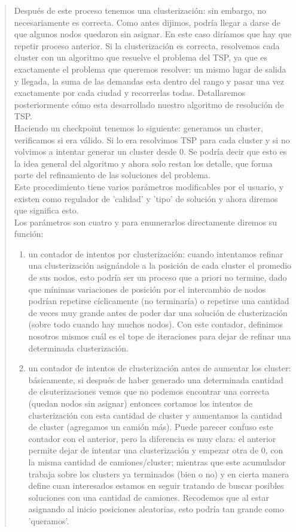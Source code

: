 \documentclass[11pt,a4paper]{article}
\begin{document}
\begin{verse}
Después de este proceso tenemos una clusterización: sin embargo, no necesariamente es correcta. Como antes dijimos, podría llegar a darse de que algunos nodos quedaron sin asignar. En este caso diríamos que hay que repetir proceso anterior. Si la clusterización es correcta, resolvemos cada cluster con un algoritmo que resuelve el problema del TSP, ya que es exactamente el problema que queremos resolver: un mismo lugar de salida y llegada, la suma de las demandas esta dentro del rango y pasar una vez exactamente por cada ciudad y recorrerlas todas. Detallaremos posteriormente cómo esta desarrollado nuestro algoritmo de resolución de TSP.\\
Haciendo un checkpoint tenemos lo siguiente: generamos un cluster, verificamos si era válido. Si lo era resolvimos TSP para cada cluster y si no volvimos a intentar generar un cluster desde 0. Se podría decir que esto es la idea general del algoritmo y ahora solo restan los detalle, que forma parte del refinamiento de las soluciones del problema.\\
Este procedimiento tiene varios parámetros modificables por el usuario, y existen como regulador de 'calidad' y 'tipo' de solución y ahora diremos que significa esto.\\
Los parámetros son cuatro y para enumerarlos directamente diremos su función:
\begin{enumerate}[label=(\roman*)]
\item un contador de intentos por clusterización: cuando intentamos refinar una clusterización asignándole a la posición de cada cluster el promedio de sus nodos, esto podría ser un proceso que a priori no termine, dado que mínimas variaciones de posición por el intercambio de nodos podrían repetirse cíclicamente (no terminaría) o repetirse una cantidad de veces muy grande antes de poder dar una solución de clusterización (sobre todo cuando hay muchos nodos). Con este contador, definimos nosotros mismos cuál es el tope de iteraciones para dejar de refinar una determinada clusterización.
\\
\item un contador de intentos de clusterización antes de aumentar los cluster: básicamente, si después de haber generado una determinada cantidad de clsuterizaciones vemos que no podemos encontrar una correcta (quedan nodos sin asignar) entonces cortamos los intentos de clusterización con esta cantidad de cluster y aumentamos la cantidad de cluster (agregamos un camión más). Puede parecer confuso este contador con el anterior, pero la diferencia es muy clara: el anterior permite dejar de intentar una clusterización y empezar otra de 0, con la misma cantidad de camiones/cluster; mientras que este acumulador trabaja sobre los clusters ya terminados (bien o no) y en cierta manera define cuan interesados estamos en seguir tratando de buscar posibles soluciones con una cantidad de camiones. Recodemos que al estar asignando al inicio posiciones aleatorias, esto podría tan grande como 'queramos'.\\

\end{enumerate}
\end{verse}
\end{document}
